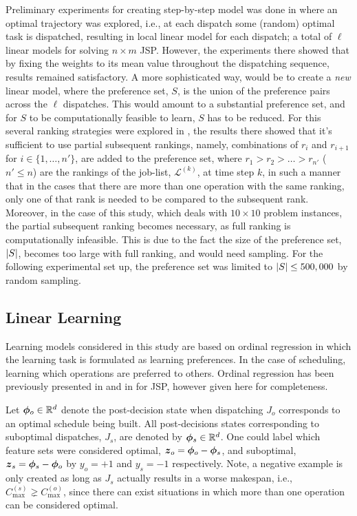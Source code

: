 \documentclass[smallextended]{svjour3}
\begin{document}
Preliminary experiments for creating step-by-step model was done in 
\cite{InRu11a} where an optimal trajectory was explored, i.e., at each dispatch 
some (random) optimal task is dispatched, resulting in local linear model for 
each dispatch; a total of $\ell$ linear models for solving $n\times m$ JSP. 
However, the experiments there showed that by fixing the weights to its mean 
value throughout the dispatching sequence, results remained satisfactory.
A more sophisticated way, would be to create a \emph{new} linear model, where 
the preference set, $S$, is the union of the preference pairs across the $\ell$ 
dispatches. 
This would amount to a substantial preference set, and for $S$ to be 
computationally feasible to learn, $S$ has to be reduced. For this several 
ranking strategies were explored in \cite{InRu15a}, the results there showed 
that it's sufficient to use partial subsequent rankings, namely, combinations 
of $r_i$ and $r_{i+1}$ for $i\in\{1,\ldots,n'\}$, are added to the preference 
set, where $r_1>r_2>\ldots>r_{n'}$ ($n'\leq n$) are the rankings of the 
job-list, $\mathcal{L}^{(k)}$, at time step $k$, in such a manner that in the 
cases that there are more than one operation with the same ranking, only one of 
that rank is needed to be compared to the subsequent rank. 
Moreover, in the case of this study, which deals with $10\times 10$ problem 
instances, the partial subsequent ranking becomes necessary, as full ranking is 
computationally infeasible. This is due to the fact the size of the preference 
set, $\lvert S\rvert$, becomes too large with full ranking, and would need sampling.
For the following experimental set up, the preference set was limited to 
$\lvert S\rvert\leq 500,000$ by random sampling.

\subsection{Linear Learning}\label{sec:liblinear}

Learning models considered in this study are based on ordinal regression in 
which the learning task is formulated as learning preferences. In the case of 
scheduling, learning which operations are preferred to others. Ordinal 
regression has been previously presented in \cite{Ru06:PPSN} and in 
\cite{InRu11a} for JSP, however given here for completeness. 

Let $\bm{\phi}_{o}\in{\mathbb R}^d$ denote the post-decision state when dispatching $J_o$ 
corresponds to an optimal schedule being built. All post-decisions states 
corresponding to suboptimal dispatches, $J_s$, are denoted by 
$\bm{\phi}_{s}\in{\mathbb R}^d$. One could label which feature sets were considered optimal, 
$\vec{z}_{o}=\vphi_{o}-\vphi_{s}$, and suboptimal, 
$\vec{z}_{s}=\vphi_{s}-\vphi_{o}$ by $y_o=+1$ and $y_s=-1$ respectively. 
Note, a negative example is only created as long as $J_s$ actually results in a 
worse makespan, i.e., $C_{\max}^{(s)}\gneq C_{\max}^{(o)}$, since there can 
exist situations in which more than one operation can be considered optimal.
\end{document}
